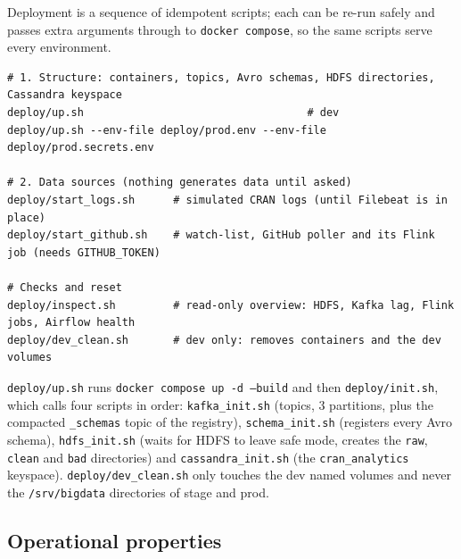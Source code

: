 \documentclass[11pt,a4paper]{article}
\begin{document}
Deployment is a sequence of idempotent scripts; each can be re-run safely and passes extra arguments through to \texttt{docker compose},
so the same scripts serve every environment.

\begin{lstlisting}
# 1. Structure: containers, topics, Avro schemas, HDFS directories, Cassandra keyspace
deploy/up.sh                                   # dev
deploy/up.sh --env-file deploy/prod.env --env-file deploy/prod.secrets.env

# 2. Data sources (nothing generates data until asked)
deploy/start_logs.sh      # simulated CRAN logs (until Filebeat is in place)
deploy/start_github.sh    # watch-list, GitHub poller and its Flink job (needs GITHUB_TOKEN)

# Checks and reset
deploy/inspect.sh         # read-only overview: HDFS, Kafka lag, Flink jobs, Airflow health
deploy/dev_clean.sh       # dev only: removes containers and the dev volumes
\end{lstlisting}

\texttt{deploy/up.sh} runs \texttt{docker compose up -d --build} and then \texttt{deploy/init.sh}, which calls four scripts in order:
\texttt{kafka\_init.sh} (topics, 3 partitions, plus the compacted \texttt{\_schemas} topic of the registry), \texttt{schema\_init.sh}
(registers every Avro schema), \texttt{hdfs\_init.sh} (waits for HDFS to leave safe mode, creates the \texttt{raw}, \texttt{clean} and \texttt{bad} directories)
and \texttt{cassandra\_init.sh} (the \texttt{cran\_analytics} keyspace). \texttt{deploy/dev\_clean.sh} only touches the dev named volumes and never the
\texttt{/srv/bigdata} directories of stage and prod.

\subsection{Operational properties}
\end{document}

